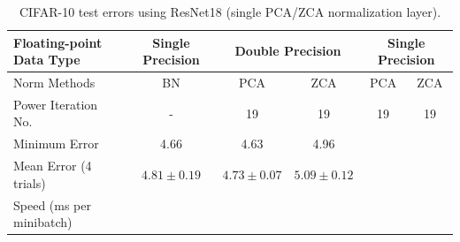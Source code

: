 \documentclass{article}
\begin{document}
\begin{table}[!htb]
\begin{centering}
\begin{tabular}{|l|c|c|c|c|c|}
\hline
Floating-point Data Type & Single Precision & \multicolumn{2}{c|}{Double Precision} & \multicolumn{2}{c|}{Single Precision} \\ \hline
Norm Methods          & BN        & PCA       & ZCA     & PCA       & ZCA  \\ \hline
Power Iteration No.   & -         & 19        & 19      &  19  &   19 \\ \hline
Minimum Error         & 4.66      & 4.63      & 4.96   &    &   \\ \hline
Mean Error (4 trials) & $4.81 \pm 0.19$ &  $4.73	\pm 0.07$ & $5.09	 \pm 0.12$   &    & \\ \hline
Speed (ms per minibatch) &                  &                   &                   &                   &                   \\ \hline
\end{tabular}
\caption{CIFAR-10 test errors using ResNet18 (single PCA/ZCA normalization layer).}
\end{centering}
\end{table}


\medskip
\small


\end{document}
